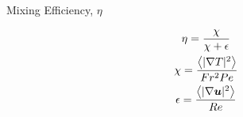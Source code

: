 \documentclass{beamer}
\begin{document}
\begin{frame}{Mixing Efficiency, $\eta$}
    \centering

        \begin{gather*}
            \eta = \frac{\chi}{\chi + \epsilon}\\
            \chi = \frac{\left<|\grad T|^2\right>}{Fr^2Pe}\\
            \epsilon = \frac{\left<|\grad \uvec|^2\right>}{Re}
        \end{gather*}
    \emp
    \emp
\end{frame}

\end{document}
